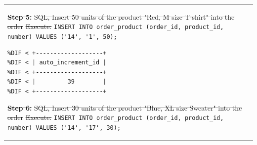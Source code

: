 \documentclass[preprint,12pt]{elsarticle}
\providecommand{\DIFdeltex}[1]{{\protect\color{red}\sout{#1}}}                      %
\providecommand{\DIFdelbegin}{} %
\providecommand{\DIFdelend}{} %
\providecommand{\DIFmodbegin}{} %
\providecommand{\DIFmodend}{} %
\providecommand{\DIFdel}[1]{\texorpdfstring{\DIFdeltex{#1}}{}} %
\newcommand{\DIFscaledelfig}{0.5}
\newlength{\DIFdelgraphicswidth} %
\newlength{\DIFdelgraphicsheight} %
\newcommand{\DIFdelincludegraphics}[2][]{%
\sbox{\DIFdelgraphicsbox}{\DIFOincludegraphics[#1]{#2}}%
\settoboxwidth{\DIFdelgraphicswidth}{\DIFdelgraphicsbox} %
\settoboxtotalheight{\DIFdelgraphicsheight}{\DIFdelgraphicsbox} %
\scalebox{\DIFscaledelfig}{%
\parbox[b]{\DIFdelgraphicswidth}{\usebox{\DIFdelgraphicsbox}\\[-\baselineskip] \rule{\DIFdelgraphicswidth}{0em}}\llap{\resizebox{\DIFdelgraphicswidth}{\DIFdelgraphicsheight}{%
\setlength{\unitlength}{\DIFdelgraphicswidth}%
\begin{picture}(1,1)%
\thicklines\linethickness{2pt} %
{\color[rgb]{1,0,0}\put(0,0){\framebox(1,1){}}}%
{\color[rgb]{1,0,0}\put(0,0){\line( 1,1){1}}}%
{\color[rgb]{1,0,0}\put(0,1){\line(1,-1){1}}}%
\end{picture}%
}\hspace*{3pt}}} %
} %
\DeclareRobustCommand{\DIFdelbegin}{\DIFOdelbegin \let\includegraphics\DIFdelincludegraphics} %
\DeclareRobustCommand{\DIFdelend}{\DIFOaddend \let\includegraphics\DIFOincludegraphics} %
\begin{document}
\begin{center}
\begin{longtable}{p{390pt}}
\textbf{\DIFdel{Step 5:}} %
\DIFdel{SQL, Insert 50 units of the product "Red, M size T-shirt" into the order}%
\DIFdel{Execute:}%
%
{\color{red}%
\lstinline!INSERT INTO order_product (order_id, product_id, number) VALUES ('14', '1', 50);! %
}%
\DIFmodbegin
\begin{lstlisting}[alsolanguage=DIFcode]
%DIF < Results from executing the SQL:
%DIF < +-------------------+
%DIF < | auto_increment_id |
%DIF < +-------------------+
%DIF < |         39        |
%DIF < +-------------------+
\end{lstlisting}
\DIFmodend %
\textbf{\DIFdel{Step 6:}} %
\DIFdel{SQL, Insert 30 units of the product "Blue, XL size Sweater" into the order}%
\DIFdel{Execute:}%
%
{\color{red}%
\lstinline!INSERT INTO order_product (order_id, product_id, number) VALUES ('14', '17', 30);! %
}%
\DIFdelend %
\end{lstlisting}\\
\DIFdelbegin %

\end{longtable}
\end{center}
\end{document}
